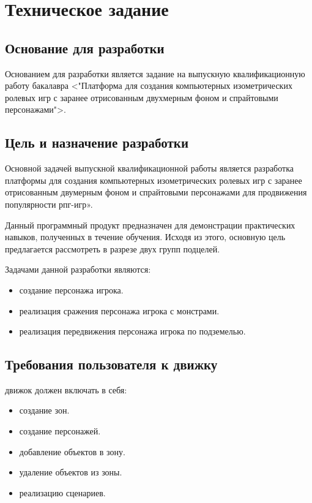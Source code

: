 \section{Техническое задание}
\subsection{Основание для разработки}

Основанием для разработки является задание на выпускную квалификационную работу бакалавра <"Платформа для создания компьютерных изометрических ролевых игр с заранее отрисованным двухмерным фоном и спрайтовыми персонажами">.

\subsection{Цель и назначение разработки}

Основной задачей выпускной квалификационной работы является разработка платформы для создания компьютерных изометрических ролевых игр с заранее отрисованным двумерным фоном и спрайтовыми персонажами для продвижения популярности рпг-игр».

Данный программный продукт предназначен для демонстрации практических навыков, полученных в течение обучения. Исходя из этого, основную цель предлагается рассмотреть в разрезе двух групп подцелей.

Задачами данной разработки являются:
\begin{itemize}
\item создание персонажа игрока.
\item реализация сражения персонажа игрока с монстрами.
\item реализация передвижения персонажа игрока по подземелью.
\end{itemize}

\subsection{Требования пользователя к движку}

движок должен включать в себя:
\begin{itemize}
    \item создание зон.
    \item создание персонажей.
    \item добавление объектов в зону.
    \item удаление объектов из зоны.
    \item реализацию сценариев.
\end{itemize}

